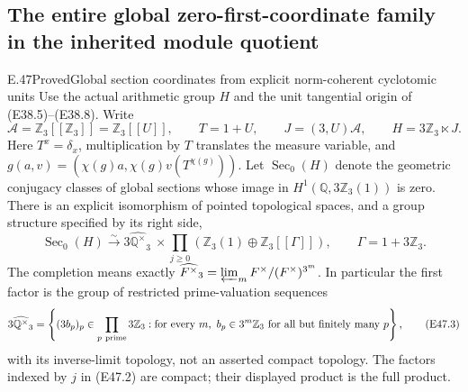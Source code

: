 \subsection{The entire global zero-first-coordinate family in the inherited module quotient}

\begin{statement}{E.47}{Proved}{Global section coordinates from explicit norm-coherent cyclotomic units}
Use the actual arithmetic group $H$ and the unit tangential
origin of (E38.5)--(E38.8). Write
\[
 \mathscr A=\mathbb Z_3[[\mathbb Z_3]]
       =\mathbb Z_3[[U]],\qquad T=1+U,\qquad
 J=(3,U)\mathscr A,\qquad
 H=3\mathbb Z_3\ltimes J.
 \tag{E47.1}
\]
Here $T^x=\delta_x$, multiplication by $T$ translates
the measure variable, and
$g(a,v)=(\chi(g)a,\chi(g)v(T^{\chi(g)}))$.
Let $\operatorname{Sec}_0(H)$ denote the geometric
conjugacy classes of global sections whose image in
$H^1(\mathbb Q,3\mathbb Z_3(1))$ is zero. There is an
explicit isomorphism of pointed topological spaces,
and a group structure specified by its right side,
\[
 \operatorname{Sec}_0(H)
 \xrightarrow{\sim}
 3\widehat{\mathbb Q^{\times}}_3
       \ \times\prod_{j\ge0}
       \left(\mathbb Z_3(1)\oplus
                    \mathbb Z_3[[\Gamma]]\right),
 \qquad \Gamma=1+3\mathbb Z_3.
 \tag{E47.2}
\]
The completion means exactly
$\widehat{F^\times}_3=\varprojlim_mF^\times/(F^\times)^{3^m}$.
In particular the first factor is the group of restricted
prime-valuation sequences
\[
 3\widehat{\mathbb Q^\times}_3
  =\left\{(3b_p)_p\in\prod_{p\ {\rm prime}}3\mathbb Z_3:
       \text{for every }m,\ b_p\in3^m\mathbb Z_3
                 \text{ for all but finitely many }p\right\},
 \tag{E47.3}
\]
with its inverse-limit topology, not an asserted compact
topology. The factors indexed by $j$ in (E47.2) are
compact; their displayed product is the full product.


\end{statement}
